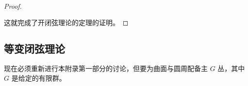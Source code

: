 \begin{proof}
\begin{figure}[H]
\centering
{}
\BookNumberOnlyCaption\label{fig:2.43}
\end{figure}

这就完成了开闭弦理论的定理的证明。
\end{proof}

\subsection{等变闭弦理论}\label{sec:2.7.3}

现在必须重新进行本附录第一部分的讨论，但要为曲面与圆周配备主 $G$ 丛，其中 $G$ 是给定的有限群。

